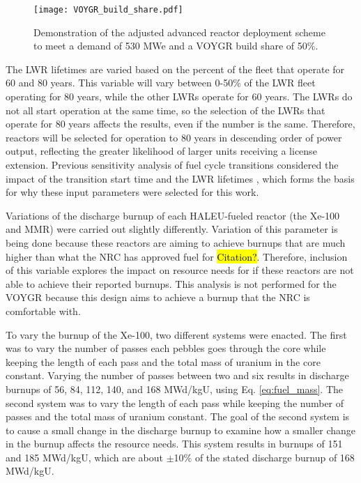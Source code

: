 \begin{figure}
    \centering 
    \texttt{[image: VOYGR\_build\_share.pdf]}
    \caption{Demonstration of the adjusted advanced reactor deployment 
    scheme to meet a demand of 530 MWe and a VOYGR build share of 
    50\%.}
    \label{fig:build-share-deploy}
\end{figure}

The \gls{LWR} lifetimes are varied based 
on the percent of the fleet that operate for 60 and 80 years. This 
variable will vary between 0-50\% of the \gls{LWR} fleet operating for 80 
years, while the other \glspl{LWR} operate for 60 years. The 
\glspl{LWR} do not all start operation at the same time, so the 
selection of the \glspl{LWR} that operate for 80 years affects the results, 
even if the number is the same. Therefore, reactors will be selected for 
operation to 80 years in 
descending order of power output, reflecting the greater likelihood of 
larger units receiving a license extension. Previous sensitivity analysis of 
fuel cycle transitions considered the impact of the transition start time 
and the \gls{LWR} lifetimes \cite{chee_sensitivity_2019,feng_sensitivity_2020},
which forms the basis for why these input parameters were selected for this 
work.

Variations of the discharge burnup of each \gls{HALEU}-fueled reactor (the 
Xe-100 and \gls{MMR}) were carried out slightly differently. Variation 
of this parameter is being done because these reactors are aiming to achieve 
burnups that are much higher than what the NRC has approved fuel for 
\hl{Citation?}. Therefore, inclusion of this variable explores the impact 
on resource needs for if these reactors are not able to achieve their 
reported burnups. This analysis is not performed for the VOYGR because this 
design aims to achieve a burnup that the NRC is comfortable with. 

To vary the burnup of the Xe-100, two different systems were enacted. The 
first was to vary the number of passes each pebbles goes through the core
while keeping the length of each pass and the total mass of uranium 
in the core constant. Varying the number of passes between two and six 
results in discharge burnups of 56, 84, 112, 140, and 168 MWd/kgU, 
using Eq. \ref{eq:fuel_mass}. The second system was to vary the length 
of each pass while keeping the number of passes and the total mass of uranium 
constant. The goal of the second system is to cause a small change in the 
discharge burnup to examine how a smaller change in the burnup affects 
the resource needs. This system results in burnups of 151 and 185 MWd/kgU, 
which are about $\pm$10\% of the stated discharge burnup of 168 MWd/kgU. 

